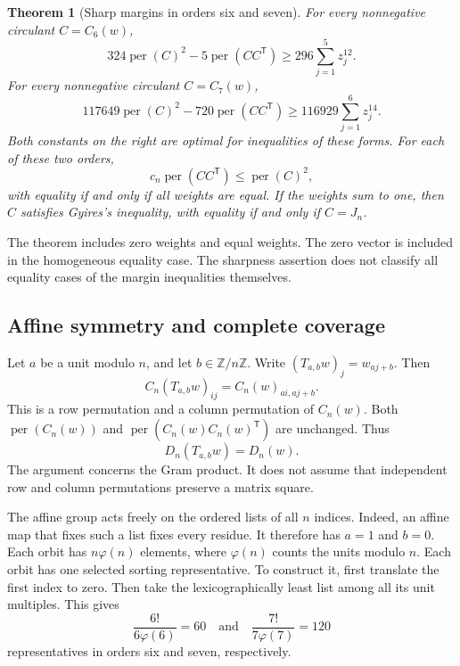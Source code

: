 \documentclass[11pt,a4paper]{article}
\newtheorem{theorem}{Theorem}[section]
\theoremstyle{definition}
\theoremstyle{remark}
\newcommand{\Z}{\mathbb{Z}}
\newcommand{\per}{\operatorname{per}}
\newcommand{\T}{\mathsf{T}}
\begin{document}
\begin{theorem}[Sharp margins in orders six and seven]\label{thm:c67-margins}
For every nonnegative circulant $C=C_6(w)$,
\begin{equation}\label{eq:c6-margin}
 324\per(C)^2-5\per(CC^\T)
 \ge296\sum_{j=1}^{5}z_j^{12}.
\end{equation}
For every nonnegative circulant $C=C_7(w)$,
\begin{equation}\label{eq:c7-margin}
 117649\per(C)^2-720\per(CC^\T)
 \ge116929\sum_{j=1}^{6}z_j^{14}.
\end{equation}
Both constants on the right are optimal for inequalities of these forms.
For each of these two orders,
\[
 c_n\per(CC^\T)\le\per(C)^2,
\]
with equality if and only if all weights are equal.
If the weights sum to one, then $C$ satisfies Gyires's inequality,
with equality if and only if $C=J_n$.
\end{theorem}

The theorem includes zero weights and equal weights.
The zero vector is included in the homogeneous equality case.
The sharpness assertion does not classify all equality cases of the
margin inequalities themselves.

\subsection{Affine symmetry and complete coverage}

Let $a$ be a unit modulo $n$, and let $b\in\Z/n\Z$.
Write $(T_{a,b}w)_j=w_{aj+b}$.
Then
\[
 C_n(T_{a,b}w)_{ij}=C_n(w)_{ai,aj+b}.
\]
This is a row permutation and a column permutation of $C_n(w)$.
Both $\per(C_n(w))$ and $\per(C_n(w)C_n(w)^\T)$ are unchanged.
Thus
\begin{equation}\label{eq:c67-affine}
 D_n(T_{a,b}w)=D_n(w).
\end{equation}
The argument concerns the Gram product. It does not assume that
independent row and column permutations preserve a matrix square.

The affine group acts freely on the ordered lists of all $n$ indices.
Indeed, an affine map that fixes such a list fixes every residue.
It therefore has $a=1$ and $b=0$.
Each orbit has $n\varphi(n)$ elements, where $\varphi(n)$ counts the units
modulo $n$. Each orbit has one selected sorting representative.
To construct it, first translate the first index to zero.
Then take the lexicographically least list among all its unit multiples.
This gives
\[
 \frac{6!}{6\varphi(6)}=60\quad\text{and}\quad
 \frac{7!}{7\varphi(7)}=120
\]
representatives in orders six and seven, respectively.
\end{document}

